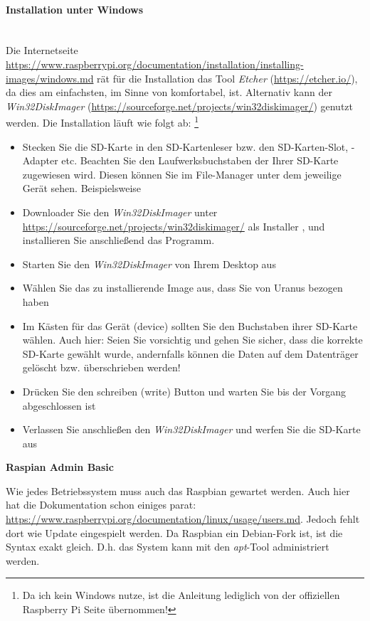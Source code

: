 \documentclass[paper=a4,fontsize=11pt]{scrartcl}%
\numberwithin{equation}{section}
\begin{document}
\paragraph{Installation unter Windows}~\\
Die Internetseite \url{https://www.raspberrypi.org/documentation/installation/installing-images/windows.md} rät für die Installation das Tool \emph{Etcher} (\url{https://etcher.io/}), da dies am einfachsten, im Sinne von komfortabel, ist. Alternativ kann der \emph{Win32DiskImager} (\url{https://sourceforge.net/projects/win32diskimager/}) genutzt werden. Die Installation läuft wie folgt ab: \footnote{Da ich kein Windows nutze, ist die Anleitung lediglich von der offiziellen Raspberry Pi Seite übernommen!}
\begin{itemize}
	\item Stecken Sie die SD-Karte in den SD-Kartenleser bzw. den SD-Karten-Slot, -Adapter etc. Beachten Sie den Laufwerksbuchstaben der Ihrer SD-Karte zugewiesen wird. Diesen können Sie im File-Manager unter dem jeweilige Gerät sehen. Beispielsweise 
	\item Downloader Sie den \emph{Win32DiskImager} unter \url{https://sourceforge.net/projects/win32diskimager/} als Installer , und installieren Sie anschließend das Programm. 
	\item Starten Sie den \emph{Win32DiskImager} von Ihrem Desktop aus
	\item Wählen Sie das zu installierende Image aus, dass Sie von Uranus bezogen haben
	\item Im Kästen für das Gerät (device) sollten Sie den Buchstaben ihrer SD-Karte wählen. Auch hier: Seien Sie vorsichtig und gehen Sie sicher, dass die korrekte SD-Karte gewählt wurde, andernfalls können die Daten auf dem Datenträger gelöscht bzw. überschrieben werden!
	\item Drücken Sie den schreiben (write) Button und warten Sie bis der Vorgang abgeschlossen ist
	\item Verlassen Sie anschließen den \emph{Win32DiskImager} und werfen Sie die SD-Karte aus
\end{itemize}
\begin{center}\Large{\textbf{Raspian Admin Basic}}\end{center}\vskip0.25in
Wie jedes Betriebssystem muss auch das Raspbian gewartet werden. Auch hier hat die Dokumentation schon einiges parat: \url{https://www.raspberrypi.org/documentation/linux/usage/users.md}. Jedoch fehlt dort wie Update eingespielt werden. Da Raspbian ein Debian-Fork ist, ist die Syntax exakt gleich. D.h. das System kann mit den \emph{apt}-Tool administriert werden.
\end{document}
